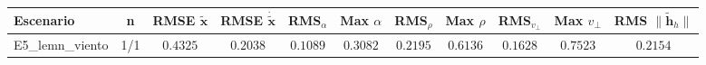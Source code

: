 \begin{tabular}{lcccccccccc}
\toprule
Escenario & n & RMSE $\tilde{\mathbf{x}}$ & RMSE $\dot{\tilde{\mathbf{x}}}$ & RMS$_\alpha$ & Max $\alpha$ & RMS$_\rho$ & Max $\rho$ & RMS$_{v_\perp}$ & Max $v_\perp$ & RMS $\|\tilde{\mathbf{h}}_h\|$ \\
\midrule
E5\_lemn\_viento & 1/1 & $0.4325$ & $0.2038$ & $0.1089$ & $0.3082$ & $0.2195$ & $0.6136$ & $0.1628$ & $0.7523$ & $0.2154$ \\
\bottomrule
\end{tabular}
